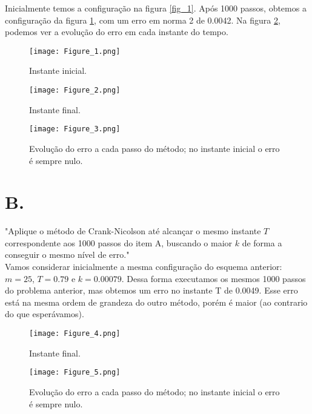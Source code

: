 \documentclass[11pt]{article}
\begin{document}
Inicialmente temos a configuração na figura \ref{fig_1}. Após 1000 passos, obtemos a configuração da figura \ref{fig_2}, com um erro em norma 2 de 0.0042. Na figura \ref{fig_3}, podemos ver a evolução do erro em cada instante do tempo.

\begin{figure}[H]
	\centering
	\begin{minipage}[B]{0.49\textwidth}	
		\texttt{[image: Figure\_1.png]}
		\caption{
Instante inicial.
		}
		\label{fig_1}
	\end{minipage}
	\hfill
	\begin{minipage}[B]{0.49\textwidth}	
		\texttt{[image: Figure\_2.png]}
		\caption{
Instante final.
		}
		\label{fig_2}
	\end{minipage}
\end{figure}
\begin{figure}[H]
	\centering
	\texttt{[image: Figure\_3.png]}
	\caption{
Evolução do erro a cada passo do método; no instante inicial o erro é sempre nulo.
	}
	\label{fig_3}
\end{figure}

\section*{B.}

"Aplique o método de Crank-Nicolson até alcançar o mesmo instante $T$
correspondente aos 1000 passos do item A, buscando o maior $k$ de
forma a conseguir o mesmo nível de erro."\\

Vamos considerar inicialmente a mesma configuração do esquema anterior: $m=25$, $T=0.79$ e $k = 0.00079$. Dessa forma executamos os mesmos 1000 passos do problema anterior, mas obtemos um erro no instante T de 0.0049. Esse erro está na mesma ordem de grandeza do outro método, porém é maior (ao contrario do que esperávamos).

\begin{figure}[H]
	\centering
	\begin{minipage}[B]{0.49\textwidth}	
		\texttt{[image: Figure\_4.png]}
		\caption{
Instante final.
		}
		\label{fig_4}
	\end{minipage}
	\hfill
	\begin{minipage}[B]{0.49\textwidth}	
		\texttt{[image: Figure\_5.png]}
		\caption{
Evolução do erro a cada passo do método; no instante inicial o erro é sempre nulo.
		}
		\label{fig_5}
	\end{minipage}
\end{figure}
\end{document}
